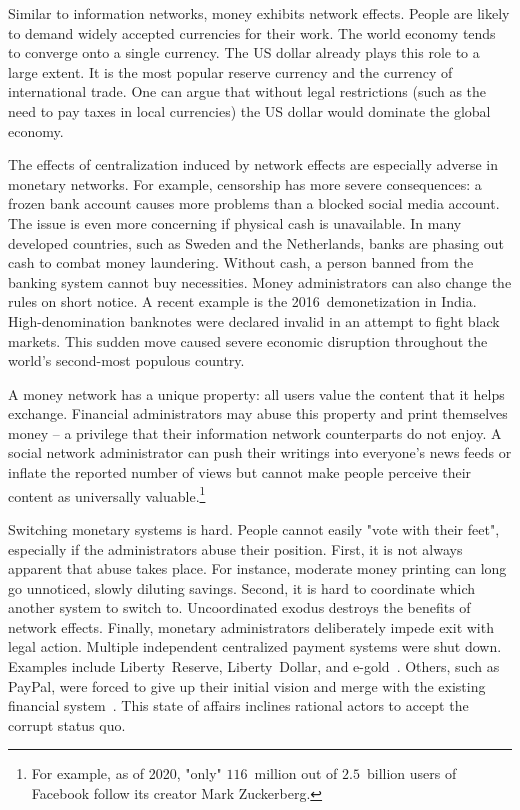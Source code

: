 Similar to information networks, money exhibits network effects.
People are likely to demand widely accepted currencies for their work.
The world economy tends to converge onto a single currency.
The US dollar already plays this role to a large extent.
It is the most popular reserve currency and the currency of international trade.
One can argue that without legal restrictions (such as the need to pay taxes in local currencies) the US dollar would dominate the global economy.

The effects of centralization induced by network effects are especially adverse in monetary networks.
For example, censorship has more severe consequences: a frozen bank account causes more problems than a blocked social media account.
The issue is even more concerning if physical cash is unavailable.
In many developed countries, such as Sweden and the Netherlands, banks are phasing out cash to combat money laundering.
Without cash, a person banned from the banking system cannot buy necessities.
Money administrators can also change the rules on short notice.
A recent example is the 2016~demonetization in India.
High-denomination banknotes were declared invalid in an attempt to fight black markets.
This sudden move caused severe economic disruption throughout the world's second-most populous country.

A money network has a unique property: all users value the content that it helps exchange.
Financial administrators may abuse this property and print themselves money -- a privilege that their information network counterparts do not enjoy.
A social network administrator can push their writings into everyone's news feeds or inflate the reported number of views but cannot make people perceive their content as universally valuable.\footnote{For example, as of 2020, "only" $116$~million out of $2.5$~billion users of Facebook follow its creator Mark Zuckerberg.}

Switching monetary systems is hard.
People cannot easily "vote with their feet", especially if the administrators abuse their position.
First, it is not always apparent that abuse takes place.
For instance, moderate money printing can long go unnoticed, slowly diluting savings.
Second, it is hard to coordinate which another system to switch to.
Uncoordinated exodus destroys the benefits of network effects.
Finally, monetary administrators deliberately impede exit with legal action.
Multiple independent centralized payment systems were shut down.
Examples include Liberty~Reserve, Liberty~Dollar, and e-gold~\cite{White2014, Trautman2014}.
Others, such as PayPal, were forced to give up their initial vision and merge with the existing financial system~\cite{Jackson2017}.
This state of affairs inclines rational actors to accept the corrupt status quo.


